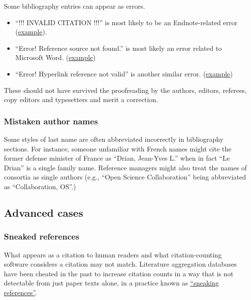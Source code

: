 \documentclass[letterpaper, 12pt]{article}
\begin{document}
Some bibliography entries can appear as errors. 
\begin{itemize}
    \setlength\itemsep{-0.5em}
    \item ``!!! INVALID CITATION !!!'' is most likely to be an Endnote-related error (\href{https://pubpeer.com/publications/87320DD76ED35F5F3023F890C15023}{example}).  
    \item ``Error! Reference source not found.'' is most likely an error related to Microsoft Word. (\href{https://pubpeer.com/publications/1BE25CD291387136DA3474C7D97287}{example})
    \item ``Error! Hyperlink reference not valid'' is another similar error. (\href{https://pubpeer.com/publications/88516C0A7BFF973A515FD3EA842022}{example}) 
\end{itemize}

These should not have survived the proofreading by the authors, editors, referees, copy editors and typesetters and merit a correction.

\subsubsection*{Mistaken author names}

Some styles of last name are often abbreviated incorrectly in bibliography sections.
For instance, someone unfamiliar with French names might cite the former defense minister of France as ``Drian, Jean-Yves L.''
when in fact ``Le Drian'' is a single family name. Reference managers might also treat the names of consortia as single authors (e.g., ``Open Science Collaboration'' being abbreviated as ``Collaboration, OS''.)

\subsection*{Advanced cases}

\subsubsection*{Sneaked references}

What appears as a citation to human readers and what citation-counting software considers a citation may not match.
Literature aggregation databases have been cheated in the past to increase citation counts in a way that is not detectable from just paper texts alone, in a practice known as \href{https://doi.org/10.1002/asi.24896}{``sneaking references''}.
\end{document}
